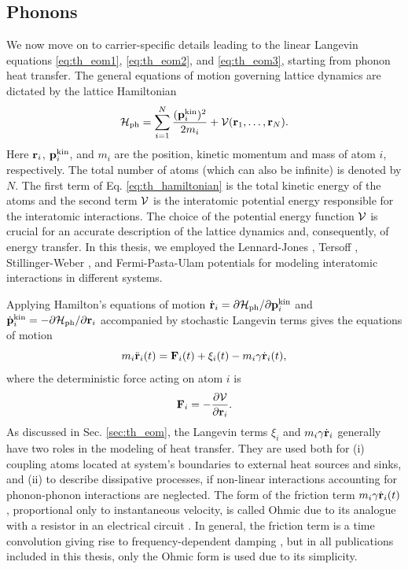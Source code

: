 \subsection{Phonons}

\label{sec:th_eom2_phonon}

We now move on to carrier-specific details leading to the linear Langevin equations \eqref{eq:th_eom1}, \eqref{eq:th_eom2}, and \eqref{eq:th_eom3}, starting from phonon heat transfer. The general equations of motion governing lattice dynamics are dictated by the lattice Hamiltonian \cite{ziman}
\begin{equation}
 \mathcal{H}_{\textrm{ph}} = \sum_{i=1}^N \frac{(\mathbf{p}^{\textrm{kin}}_i)^2}{2m_i} + \mathcal{V}(\mathbf{r}_1,\dots,\mathbf{r}_N). \label{eq:th_hamiltonian}
\end{equation}
Here $\mathbf{r}_i$, $\mathbf{p}^{\textrm{kin}}_i$, and $m_i$ are the position, kinetic momentum and mass of atom $i$, respectively. The total number of atoms (which can also be infinite) is denoted by $N$. The first term of Eq. \eqref{eq:th_hamiltonian} is the total kinetic energy of the atoms and the second term $\mathcal{V}$ is the interatomic potential energy responsible for the interatomic interactions. The choice of the potential energy function $\mathcal{V}$ is crucial for an accurate description of the lattice dynamics and, consequently, of energy transfer. In this thesis, we employed the Lennard-Jones \cite{allentildesley}, Tersoff \cite{tersoff88a}, Stillinger-Weber \cite{stillinger85}, and Fermi-Pasta-Ulam \cite{fermi55} potentials for modeling interatomic interactions in different systems.  

Applying Hamilton's equations of motion $\dot{\mathbf{r}}_i=\partial \mathcal{H}_{\textrm{ph}}/\partial \mathbf{p}_i^{\textrm{kin}}$ and $\dot{\mathbf{p}}_i^{\textrm{kin}}=-\partial \mathcal{H}_{\textrm{ph}}/\partial \mathbf{r}_i$ \cite{fetter} accompanied by stochastic Langevin terms \cite{dhar06} gives the equations of motion
\begin{equation}
 m_i \ddot{\mathbf{r}}_i(t) = \mathbf{F}_i(t) + \xi_i(t) - m_i \gamma \dot{\mathbf{r}}_i(t), \label{eq:th_eom}
\end{equation}
where the deterministic force acting on atom $i$ is
\begin{equation}
 \mathbf{F}_i = - \frac{\partial \mathcal{V}}{\partial \mathbf{r}_i}. \label{eq:th_force}
\end{equation}
As discussed in Sec. \ref{sec:th_eom}, the Langevin terms $\xi_i$ and $m_i\gamma \dot{\mathbf{r}}_i$ generally have two roles in the modeling of heat transfer. They are used both for (i) coupling atoms located at system's boundaries to external heat sources and sinks,  and (ii) to describe dissipative processes, if non-linear interactions accounting for phonon-phonon interactions are neglected. The form of the friction term $m_i \gamma \dot{\mathbf{r}}_i(t)$, proportional only to instantaneous velocity, is called Ohmic due to its analogue with a resistor in an electrical circuit \cite{weiss}. In general, the friction term is a time convolution giving rise to frequency-dependent damping \cite{weiss}, but in all publications included in this thesis, only the Ohmic form is used due to its simplicity.
 
